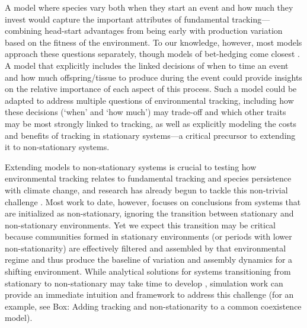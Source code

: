 \documentclass[11pt,letterpaper]{article}
\begin{document}
A model where species vary both when they start an event and how much they invest would capture the important attributes of fundamental tracking---combining head-start advantages from being early with production variation based on the fitness of the environment. To our knowledge, however, most models approach these questions separately, though models of bet-hedging come closest \citep{Gourbiere2009,tufto2015}. A model that explicitly includes the linked decisions of when to time an event and how much offspring/tissue to produce during the event could provide insights on the relative importance of each aspect of this process. Such a model could be adapted to address multiple questions of environmental tracking, including how these decisions (`when' and `how much') may trade-off and which other traits may be most strongly linked to tracking, as well as explicitly modeling the costs and benefits of tracking in stationary systems---a critical precursor to extending it to non-stationary systems. 

Extending models to non-stationary systems is crucial to testing how environmental tracking relates to fundamental tracking and species persistence with climate change, and research has already begun to tackle this non-trivial challenge \citep{chessonnonstat,legault2019,volkerass}. Most work to date, however, focuses on conclusions from systems that are initialized as non-stationary, ignoring the transition between stationary and non-stationary environments. Yet we expect this transition may be critical because communities formed in stationary environments (or periods with lower non-stationarity) are effectively filtered and assembled by that environmental regime and thus produce the baseline of variation and assembly dynamics for a shifting environment. While analytical solutions for systems transitioning from stationary to non-stationary may take time to develop \citep{chessonnonstat}, simulation work can provide an immediate intuition and framework to address this challenge (for an example, see Box: Adding tracking and non-stationarity to a common coexistence model). 
\end{document}
